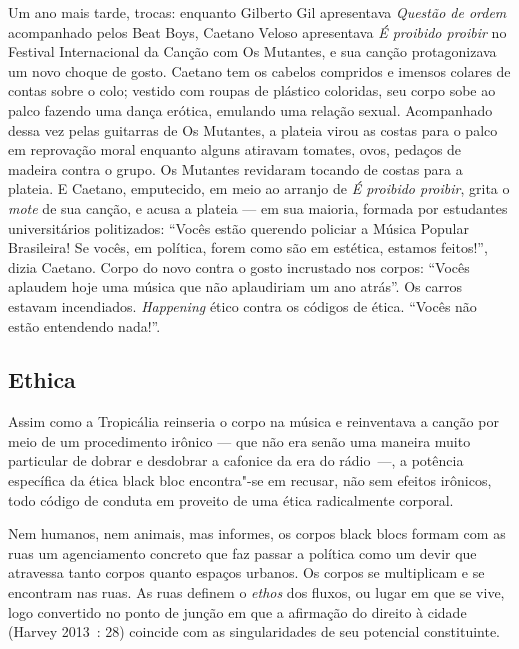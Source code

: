 Um ano mais tarde, trocas: enquanto Gilberto Gil apresentava
\emph{Questão de ordem }acompanhado pelos Beat Boys, Caetano\emph{
}Veloso apresentava \emph{É proibido proibir} no  Festival
Internacional da Canção com Os Mutantes, e sua canção protagonizava um
novo choque de gosto. Caetano tem os cabelos compridos e imensos colares
de contas sobre o colo; vestido com roupas de plástico coloridas, seu
corpo sobe ao palco fazendo uma dança erótica, emulando uma relação
sexual. Acompanhado dessa vez pelas guitarras de Os Mutantes, a plateia
virou as costas para o palco em reprovação moral enquanto alguns
atiravam tomates, ovos, pedaços de madeira contra o grupo. Os Mutantes
revidaram tocando de costas para a plateia. E Caetano, emputecido, em
meio ao arranjo de \emph{É proibido proibir}, grita o \emph{mote }de sua
canção, e acusa a plateia --- em sua maioria, formada por estudantes
universitários politizados: ``Vocês estão querendo policiar a Música
Popular Brasileira! Se vocês, em política, forem como são em estética,
estamos feitos!'', dizia Caetano. Corpo do novo contra o gosto
incrustado nos corpos: ``Vocês aplaudem hoje uma música que não
aplaudiriam um ano atrás''. Os carros estavam incendiados.
\emph{Happening }ético contra os códigos de ética. ``Vocês não estão
entendendo nada!''.

\subsection{Ethica}

Assim como a Tropicália reinseria o corpo na música e
reinventava a canção por meio de um procedimento irônico --- que não era
senão uma maneira muito particular de dobrar e desdobrar a cafonice da
era do rádio~---, a potência específica da ética black bloc encontra"-se
em recusar, não sem efeitos irônicos, todo código de conduta em proveito
de uma ética radicalmente corporal.

Nem humanos, nem animais, mas informes, os corpos black blocs formam com
as ruas um agenciamento concreto que faz passar a política como um devir
que atravessa tanto corpos quanto espaços urbanos. Os corpos se
multiplicam e se encontram nas ruas. As ruas definem o \emph{ethos }dos
fluxos, ou lugar em que se vive, logo convertido no ponto de junção em
que a afirmação do direito à cidade (Harvey 2013~: 28) coincide com as
singularidades de seu potencial constituinte.

